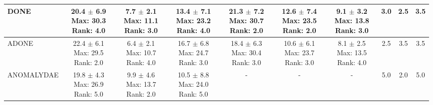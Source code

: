 \begin{longtable}{|l|c|c|c|c|c|c|c|c|c|}
DONE & \makecell{ 20.4 $\pm$ 6.9 \\ \scriptsize Max: 30.3 \\ \scriptsize Rank: 4.0 } & \makecell{ 7.7 $\pm$ 2.1 \\ \scriptsize Max: 11.1 \\ \scriptsize Rank: 3.0 } & \makecell{ 13.4 $\pm$ 7.1 \\ \scriptsize Max: 23.2 \\ \scriptsize Rank: 4.0 } & \makecell{ 21.3 $\pm$ 7.2 \\ \scriptsize Max: 30.7 \\ \scriptsize Rank: 2.0 } & \makecell{ 12.6 $\pm$ 7.4 \\ \scriptsize Max: 23.5 \\ \scriptsize Rank: 2.0 } & \makecell{ 9.1 $\pm$ 3.2 \\ \scriptsize Max: 13.8 \\ \scriptsize Rank: 3.0 } & 3.0 & 2.5 & 3.5 \\ \hline 
ADONE & \makecell{ 22.4 $\pm$ 6.1 \\ \scriptsize Max: 29.5 \\ \scriptsize Rank: 2.0 } & \makecell{ 6.4 $\pm$ 2.1 \\ \scriptsize Max: 10.7 \\ \scriptsize Rank: 4.0 } & \makecell{ 16.7 $\pm$ 6.8 \\ \scriptsize Max: 24.7 \\ \scriptsize Rank: 3.0 } & \makecell{ 18.4 $\pm$ 6.3 \\ \scriptsize Max: 30.4 \\ \scriptsize Rank: 3.0 } & \makecell{ 10.6 $\pm$ 6.1 \\ \scriptsize Max: 23.7 \\ \scriptsize Rank: 3.0 } & \makecell{ 8.1 $\pm$ 2.5 \\ \scriptsize Max: 13.5 \\ \scriptsize Rank: 4.0 } & 2.5 & 3.5 & 3.5 \\ \hline 
ANOMALYDAE & \makecell{ 19.8 $\pm$ 4.3 \\ \scriptsize Max: 26.9 \\ \scriptsize Rank: 5.0 } & \makecell{ 9.9 $\pm$ 4.6 \\ \scriptsize Max: 13.7 \\ \scriptsize Rank: 2.0 } & \makecell{ 10.5 $\pm$ 8.8 \\ \scriptsize Max: 24.0 \\ \scriptsize Rank: 5.0 } & - & - & - & 5.0 & 2.0 & 5.0 \\ \hline 

\end{longtable}

